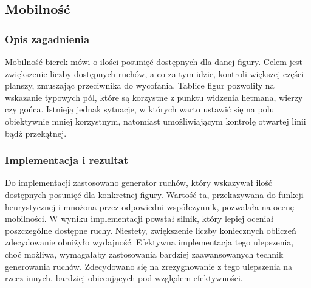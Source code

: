 \subsection{Mobilność}
\label{subsec:mobilnosc}

\subsubsection{Opis zagadnienia}
Mobilność bierek mówi o ilości posunięć dostępnych dla danej figury.
Celem jest zwiększenie liczby dostępnych ruchów, a co za tym idzie, kontroli większej części planszy, zmuszając przeciwnika do wycofania.
Tablice figur pozwoliły na wskazanie typowych pól, które są korzystne z punktu widzenia hetmana, wierzy czy gońca.
Istnieją jednak sytuacje, w których warto ustawić się na polu obiektywnie mniej korzystnym, natomiast umożliwiającym kontrolę otwartej linii bądź przekątnej.

\subsubsection{Implementacja i rezultat}
Do implementacji zastosowano generator ruchów, który wskazywał ilość dostępnych posunięć dla konkretnej figury.
Wartość ta, przekazywana do funkcji heurystycznej i mnożona przez odpowiedni współczynnik, pozwalała na ocenę mobilności.
W wyniku implementacji powstał silnik, który lepiej oceniał poszczególne dostępne ruchy.
Niestety, zwiększenie liczby koniecznych obliczeń zdecydowanie obniżyło wydajność.
Efektywna implementacja tego ulepszenia, choć możliwa, wymagałaby zastosowania bardziej zaawansowanych technik generowania ruchów.
Zdecydowano się na zrezygnowanie z tego ulepszenia na rzecz innych, bardziej obiecujących pod względem efektywności.